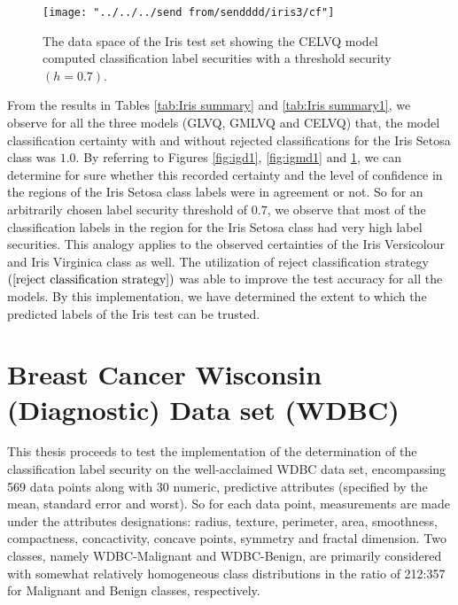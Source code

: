 \begin{figure}[H]
	\centering
	\texttt{[image: "../../../send from/sendddd/iris3/cf"]}
	\caption[Iris test set classification label security (CELVQ)]{The data space of the Iris test set showing the CELVQ model computed classification label securities with a threshold security $(h=0.7)$.}
	\label{fig:icd1}
\end{figure}


From the results in Tables \ref{tab:Iris summary} and \ref{tab:Iris summary1}, we observe for all the three models (GLVQ, GMLVQ and CELVQ) that, the model classification certainty with and without rejected classifications for the Iris Setosa class was\hspace{2pt} $1.0$\hspace{2pt}. By referring to Figures \ref{fig:igd1}, \ref{fig:igmd1} and \ref{fig:icd1}, we can determine for sure whether this recorded certainty and the level of confidence in the regions of the Iris Setosa class labels were in agreement or not. So for an arbitrarily chosen label security threshold of\hspace{2pt} $0.7$, we observe that most of the classification labels in the region for the Iris Setosa class had very high label securities. This analogy applies to the observed certainties of the Iris Versicolour and Iris Virginica class as well. The utilization of reject classification strategy $\left( \ref{reject classification strategy}\right) $ was able to improve the test accuracy for all the models. By this implementation, we have determined the extent to which the predicted labels of the Iris test can be trusted.



\section{Breast Cancer Wisconsin (Diagnostic) Data set (WDBC)}
This thesis proceeds to test the implementation of the determination of the classification label security on the well-acclaimed WDBC data set\cite{street1993nuclear}, encompassing 569 data points along with 30 numeric, predictive attributes (specified by the mean, standard error and worst). So for each data point, measurements are made under the attributes designations: radius, texture, perimeter, area, smoothness, compactness, concactivity, concave points, symmetry and fractal dimension. Two classes, namely WDBC-Malignant and WDBC-Benign, are primarily considered with somewhat relatively homogeneous class distributions in the ratio of  212:357 for Malignant and Benign classes, respectively.

